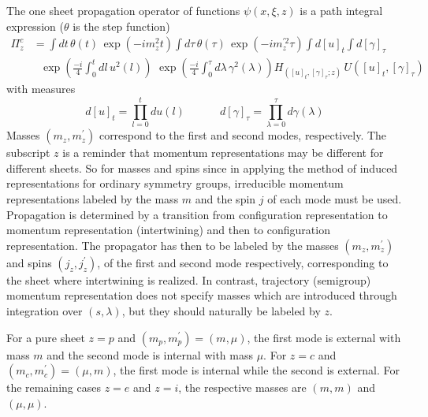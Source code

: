 \documentclass[12pt,a4paper]{article}
\begin{document}
The one sheet propagation operator of functions $\psi\left(  x,\xi,z\right)  $
is a path integral expression\cite{Smida 1998} ($\theta$ is the step
function)
\begin{align}
\Pi_{z}^{c}  & =\int dt\,\theta(t)\,\exp(-im_{z}^{2}t)\int d\tau\,\theta
(\tau)\,\exp(-im_{z}^{\prime2}\tau)\int d[u]_{t}\int d[\gamma]_{\tau}\\
& \ \ \ \exp(\frac{-i}{4}\int_{0}^{t}dl\,u^{2}(l))\,\,\exp(\frac{-i}{4}%
\int_{0}^{\tau}d\lambda\,\gamma^{2}(\lambda))H_{([u]_{t},[\gamma]_{\tau}%
;z)}\,U([u]_{t},[\gamma]_{\tau})\nonumber
\end{align}
with measures
\begin{equation}
d[u]_{t}=\prod_{l=0}^{t}du(l)\,\,\,\,\,\,\,\,\,\,\,\,\,\,\,\,\,\,\,d[\gamma
]_{\tau}=\prod_{\lambda=0}^{\tau}d\gamma(\lambda)
\end{equation}
Masses $\left(  m_{z},m_{z}^{\prime}\right)  $ correspond to the first and
second modes, respectively. The subscript $z$ is a reminder that momentum
representations may be different for different sheets. So for masses and spins
since in applying the method of induced representations for ordinary symmetry
groups, irreducible momentum representations labeled by the mass $m$ and the
spin $j$ of each mode must be used. Propagation is determined by a transition
from configuration representation to momentum representation (intertwining)
and then to configuration representation. The propagator has then to be
labeled by the masses $\left(  m_{z},m_{z}^{\prime}\right)  $ and spins
$\left(  j_{z},j_{z}^{\prime}\right)  $, of the first and second mode
respectively, corresponding to the sheet where intertwining is realized. In
contrast, trajectory (semigroup) momentum representation does not specify
masses which are introduced through integration over $\left(  s,\lambda
\right)  $,\cite{Smida 1998} but they should naturally be labeled by $z$.

For a pure sheet $z=p$ and $\left(  m_{p},m_{p}^{\prime}\right)  =\left(
m,\mu\right)  $, the first mode is external with mass $m$ and the second mode
is internal with mass $\mu$. For $z=c$ and $\left(  m_{c},m_{c}^{\prime
}\right)  =\left(  \mu,m\right)  $, the first mode is internal while the
second is external. For the remaining cases $z=e$ and $z=i$, the respective
masses are $\left(  m,m\right)  $ and $\left(  \mu,\mu\right)  $.
\end{document}
